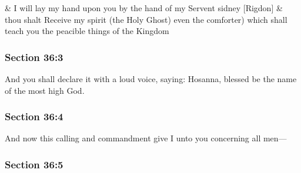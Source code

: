 		\begin{framed}
		\scriptsize
			\begin{compactdesc}
				\item[JSP] \& I will lay my hand upon you by the hand of my Servent sidney [Rigdon] \& thou shalt Receive my spirit (the Holy Ghost) even the comforter) which shall teach you the peacible things of the Kingdom
			\end{compactdesc}
		\end{framed}

	\subsubsection{Section 36:3} %
		\label{DC36-3}

		And you shall declare it with a loud voice, saying: Hosanna, blessed be the name of the most high God.


	\subsubsection{Section 36:4} %
		\label{DC36-4}

		And now this calling and commandment give I unto you concerning all men---


	\subsubsection{Section 36:5} %
		\label{DC36-5}

